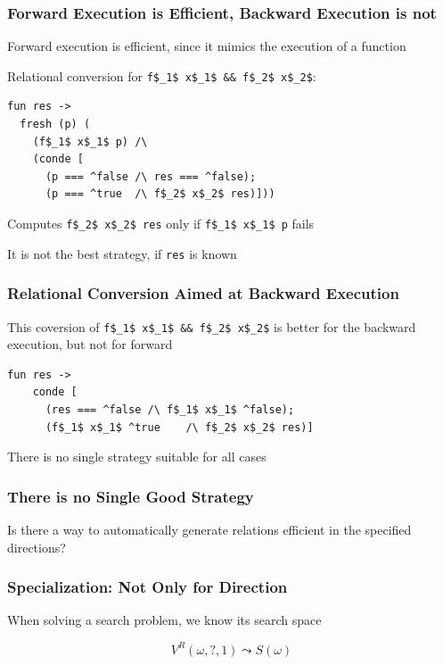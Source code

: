 \documentclass[xcolor=table]{beamer}
\begin{document}
\begin{frame}[fragile]
  \transwipe[direction=90]
  \frametitle{Forward Execution is Efficient, Backward Execution is not}
  
  Forward execution is efficient, since it mimics the execution of a function
  
\vspace{6pt}  
  
Relational conversion for \lstinline{f$_1$ x$_1$ && f$_2$ x$_2$}: 
 
\begin{lstlisting}
fun res ->
  fresh (p) (
    (f$_1$ x$_1$ p) /\
    (conde [
      (p === ^false /\ res === ^false);
      (p === ^true  /\ f$_2$ x$_2$ res)]))
\end{lstlisting} 

Computes \lstinline{f$_2$ x$_2$ res} only if \lstinline{f$_1$ x$_1$ p} fails

\vspace{6pt}

It is not the best strategy, if \lstinline{res} is known

\end{frame}

\begin{frame}[fragile]
  \transwipe[direction=90]
  \frametitle{Relational Conversion Aimed at Backward Execution}

This coversion of  \lstinline{f$_1$ x$_1$ && f$_2$ x$_2$} is better for the backward execution, but not for forward

\begin{lstlisting}
fun res ->
    conde [
      (res === ^false /\ f$_1$ x$_1$ ^false);
      (f$_1$ x$_1$ ^true    /\ f$_2$ x$_2$ res)]
\end{lstlisting}


  There is no single strategy suitable for all cases
\end{frame}

\begin{frame}[fragile]
  \transwipe[direction=90]
  \frametitle{There is no Single Good Strategy}
  
\begin{center}  
Is there a way to automatically generate relations efficient in the specified directions? 
\end{center}
  
\end{frame}


\begin{frame}[fragile]
  \transwipe[direction=90]
  \frametitle{Specialization: Not Only for Direction}
\begin{center} When solving a search problem, we know its search space  \end{center}
  
\[  V^R(\omega, ?, 1) \leadsto S(\omega) \]
\end{frame}
\end{document}
